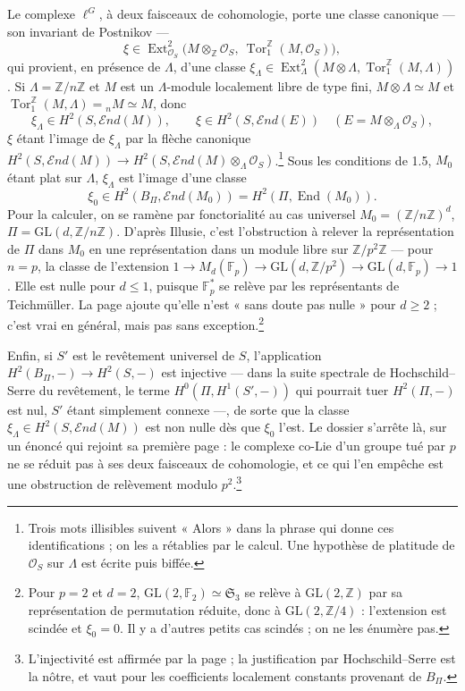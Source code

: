 \documentclass[11pt,a4paper]{article}
\begin{document}
Le complexe $\ell^{G}$, à deux faisceaux de cohomologie, porte une classe
canonique — son invariant de Postnikov —
\[
\xi \in \operatorname{Ext}^{2}_{\mathcal{O}_{S}}\bigl(M \otimes_{\mathbb{Z}}
\mathcal{O}_{S},\ \operatorname{Tor}_{1}^{\mathbb{Z}}(M, \mathcal{O}_{S})\bigr),
\]
qui provient, en présence de $\Lambda$, d'une classe
$\xi_{\Lambda} \in \operatorname{Ext}^{2}_{\Lambda}(M \otimes \Lambda,
\operatorname{Tor}_{1}^{\mathbb{Z}}(M, \Lambda))$. Si $\Lambda =
\mathbb{Z}/n\mathbb{Z}$ et $M$ est un $\Lambda$-module localement libre de
type fini, $M \otimes \Lambda \simeq M$ et
$\operatorname{Tor}_{1}^{\mathbb{Z}}(M, \Lambda) = {}_{n}M \simeq M$, donc
\[
\xi_{\Lambda} \in H^{2}(S, \mathcal{E}nd(M)), \qquad
\xi \in H^{2}(S, \mathcal{E}nd(E)) \quad (E = M \otimes_{\Lambda}
\mathcal{O}_{S}),
\]
$\xi$ étant l'image de $\xi_{\Lambda}$ par la flèche canonique
$H^{2}(S, \mathcal{E}nd(M)) \to H^{2}(S, \mathcal{E}nd(M) \otimes_{\Lambda}
\mathcal{O}_{S})$.\footnote{Trois mots illisibles suivent « Alors » dans la
phrase qui donne ces identifications ; on les a rétablies par le calcul.
Une hypothèse de platitude de $\mathcal{O}_{S}$ sur $\Lambda$ est écrite
puis biffée.} Sous les conditions de 1.5, $M_{0}$ étant plat sur $\Lambda$,
$\xi_{\Lambda}$ est l'image d'une classe
\[
\xi_{0} \in H^{2}(B_{\Pi}, \mathcal{E}nd(M_{0})) = H^{2}(\Pi,
\operatorname{End}(M_{0})) .
\]
Pour la calculer, on se ramène par fonctorialité au cas universel
$M_{0} = (\mathbb{Z}/n\mathbb{Z})^{d}$, $\Pi = \mathrm{GL}(d,
\mathbb{Z}/n\mathbb{Z})$. D'après Illusie, c'est l'obstruction à relever la
représentation de $\Pi$ dans $M_{0}$ en une représentation dans un module
libre sur $\mathbb{Z}/p^{2}\mathbb{Z}$ — pour $n = p$, la classe de
l'extension $1 \to M_{d}(\mathbb{F}_{p}) \to \mathrm{GL}(d,
\mathbb{Z}/p^{2}) \to \mathrm{GL}(d, \mathbb{F}_{p}) \to 1$. Elle est nulle
pour $d \le 1$, puisque $\mathbb{F}_{p}^{*}$ se relève par les
représentants de Teichmüller. La page ajoute qu'elle n'est « sans doute pas
nulle » pour $d \ge 2$ ; c'est vrai en général, mais pas sans
exception.\footnote{Pour $p = 2$ et $d = 2$, $\mathrm{GL}(2, \mathbb{F}_{2})
\simeq \mathfrak{S}_{3}$ se relève à $\mathrm{GL}(2, \mathbb{Z})$ par sa
représentation de permutation réduite, donc à $\mathrm{GL}(2,
\mathbb{Z}/4)$ : l'extension est scindée et $\xi_{0} = 0$. Il y a d'autres
petits cas scindés ; on ne les énumère pas.}

Enfin, si $S'$ est le revêtement universel de $S$, l'application
$H^{2}(B_{\Pi}, -) \to H^{2}(S, -)$ est injective — dans la suite spectrale de
Hochschild--Serre du revêtement, le terme $H^{0}(\Pi, H^{1}(S', -))$ qui
pourrait tuer $H^{2}(\Pi, -)$ est nul, $S'$ étant simplement connexe —, de
sorte que la classe $\xi_{\Lambda} \in H^{2}(S, \mathcal{E}nd(M))$ est non
nulle dès que $\xi_{0}$ l'est. Le dossier s'arrête là, sur un énoncé qui
rejoint sa première page : le complexe co-Lie d'un groupe tué par $p$ ne se
réduit pas à ses deux faisceaux de cohomologie, et ce qui l'en empêche est
une obstruction de relèvement modulo $p^{2}$.\footnote{L'injectivité est
affirmée par la page ; la justification par Hochschild--Serre est la
nôtre, et vaut pour les coefficients localement constants provenant de
$B_{\Pi}$.}
\end{document}
